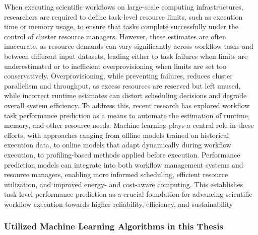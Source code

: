When executing scientific workflows on large-scale computing infrastructures, researchers are required to define task-level resource limits, such as execution time or memory usage, to ensure that tasks complete successfully under the control of cluster resource managers. However, these estimates are often inaccurate, as resource demands can vary significantly across workflow tasks and between different input datasets, leading either to task failures when limits are underestimated or to inefficient overprovisioning when limits are set too conservatively. Overprovisioning, while preventing failures, reduces cluster parallelism and throughput, as excess resources are reserved but left unused, while incorrect runtime estimates can distort scheduling decisions and degrade overall system efficiency. To address this, recent research has explored workflow task performance prediction as a means to automate the estimation of runtime, memory, and other resource needs. Machine learning plays a central role in these efforts, with approaches ranging from offline models trained on historical execution data, to online models that adapt dynamically during workflow execution, to profiling-based methods applied before execution. Performance prediction models can integrate into both workflow management systems and resource managers, enabling more informed scheduling, efficient resource utilization, and improved energy- and cost-aware computing. This establishes task-level performance prediction as a crucial foundation for advancing scientific workflow execution towards higher reliability, efficiency, and sustainability %

\subsubsection{Utilized Machine Learning Algorithms in this Thesis}
\label{sec:background_ml_algorithms}

